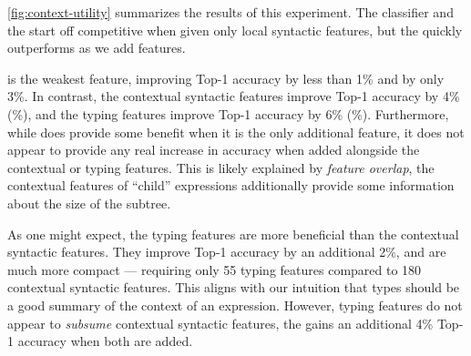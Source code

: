 %
\autoref{fig:context-utility} summarizes the results of this experiment.
%
The \linear classifier and the \hiddenFH start off
competitive when given only local syntactic features, but the \hiddenFH
quickly outperforms as we add features.

\ExprSize is the weakest feature, improving \linear Top-1
accuracy by less than 1\% and \hiddenFH by only 3\%.
%
In contrast, the contextual syntactic features improve \linear Top-1
accuracy by 4\% (\%), and the typing features improve
Top-1 accuracy by 6\% (\%).
%
Furthermore, while \ExprSize does provide some benefit when it is the
only additional feature, it does not appear to provide any real increase
in accuracy when added alongside the contextual or typing features.
%
This is likely explained by \emph{feature overlap}, \ie the contextual
features of ``child'' expressions additionally provide some information
about the size of the subtree.

As one might expect, the typing features are more beneficial than the
contextual syntactic features.
%
They improve Top-1 accuracy by an additional 2\%, and are much more
compact --- requiring only 55 typing features compared to 180
contextual syntactic features.
%
This aligns with our intuition that types should be a good summary of
the context of an expression.
%
However, typing features do not appear to \emph{subsume} contextual
syntactic features, the \hiddenFH gains an additional 4\% Top-1 accuracy
when both are added.

